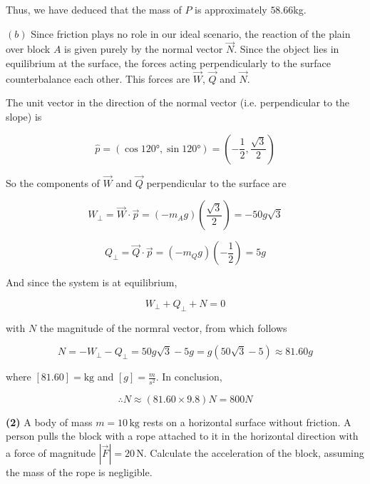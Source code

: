 \documentclass[12pt]{article}
\theoremstyle{definition}
\begin{document}
Thus, we have deduced that the mass of $P$ is approximately $58.66$kg.

$(b)$ Since friction plays no role in our ideal scenario, the reaction of the
plain over block $A$ is given purely by the normal vector $\vec{N}$. Since the
object lies in equilibrium at the surface, the forces acting perpendicularly to
the surface counterbalance each other. This forces are $\vec{W}$, $\vec{Q}$ and
$\vec{N}$. 

The unit vector in the direction of the normal vector (i.e. perpendicular to the
slope) is 

\begin{equation}
    \hat{p} = (\cos \ang{120}, \sin \ang{120}) = \left( -\frac{1}{2}, 
    \frac{ \sqrt{3} }{2}  \right) 
\end{equation}

So the components of $\vec{W}$ and $\vec{Q}$ perpendicular to the surface are 

\begin{equation}
    W_{\perp} = \vec{W} \cdot \vec{p} = \left( -m_Ag \right) 
    \left( \frac{ \sqrt{3} }{2}  \right) = -50g\sqrt{3} 
\end{equation}

\begin{equation}
    Q_{\perp} = \vec{Q} \cdot \vec{p} = \left( -m_Q g \right) \left(
    -\frac{1}{2} \right) = 5g
\end{equation}

And since the system is at equilibrium, 

\begin{equation}
    W_{\perp} + Q_\perp + N = 0
\end{equation}

with $N$ the magnitude of the normral vector, from which follows 

\begin{equation}
    N = -W_{\perp} - Q_\perp = 50g\sqrt{3}  - 5g = g(50\sqrt{3} - 5 ) \approx
    81.60g 
\end{equation}

where $\left[ 81.60 \right] = \text{kg}$ and $\left[ g \right] = \frac{m}{s^2}$.
In conclusion, 

\begin{equation}
    \therefore N \approx ( 81.60 \times 9.8 )N = 800N
\end{equation}

\pagebreak 

\begin{shaded}
\textbf{(2)} A body of mass $m = 10 \,\text{kg}$ rests on a horizontal surface without friction. A person pulls the block with a rope attached to it in the horizontal direction with a force of magnitude $|\vec{F}| = 20 \,\text{N}$. Calculate the acceleration of the block, assuming the mass of the rope is negligible.
\end{shaded}
\end{document}
